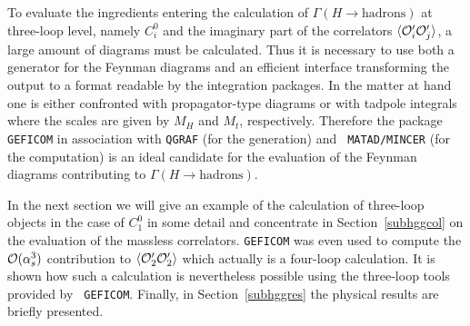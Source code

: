 To evaluate the ingredients entering the calculation of
$\Gamma(H\to\mbox{hadrons})$ at three-loop level, namely $C_i^0$ and the
imaginary part of the correlators $\langle{\cal O}'_i{\cal O}'_j\rangle$,
a large amount of diagrams must be calculated. Thus it is necessary to
use both a generator for the Feynman diagrams and an efficient interface
transforming the output to a format readable by the integration packages.
In the matter at hand one is either confronted with
propagator-type diagrams or with tadpole integrals where the scales are
given by $M_H$ and $M_t$, respectively.  Therefore the package {\tt
  GEFICOM} in association with {\tt QGRAF} (for the generation) and {\tt
  MATAD/MINCER} (for the computation) is an ideal candidate for the
evaluation of the Feynman diagrams contributing to
$\Gamma(H\to\mbox{hadrons})$.

In the next section we will give an example of the calculation of three-loop
objects in the case of $C_1^0$ in some detail and concentrate in
Section~\ref{subhggcol} on the evaluation of the massless correlators.
{\tt GEFICOM} was even used to compute the ${\cal O}(\alpha_s^3)$
contribution to $\langle {\cal O}'_2 {\cal O}'_2\rangle$ which actually
is a four-loop calculation. It is shown how such a calculation is
nevertheless possible using the three-loop tools provided by {\tt
  GEFICOM}.  Finally, in Section~\ref{subhggres} the physical results
are briefly presented.


